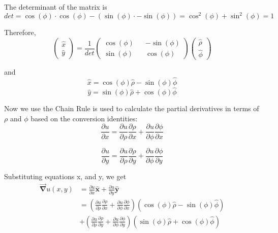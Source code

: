 \documentclass[11pt]{article}
\begin{document}
The determinant of the matrix is\\
\[det = \cos(\phi) \cdot \cos(\phi) - (\sin(\phi) \cdot -\sin(\phi)) = \cos^2(\phi) + \sin^2(\phi) = 1 \]

Therefore,
\[\left( \begin{array}{c} \hat{x} \\ \hat{y} \end{array} \right) = \frac{1}{det} \left(\begin{array}{cc} \cos(\phi) && -\sin(\phi) \\ \sin(\phi) && \cos(\phi) \end{array} \right) \left( \begin{array}{c} \hat{\rho} \\ \hat{\phi} \end{array} \right)\]

and \[\hat{x} = \cos(\phi) \hat{\rho} - \sin(\phi) \hat{\phi}\]
\[\hat{y} = \sin(\phi) \hat{\rho} + \cos(\phi) \hat{\phi}\]

Now we use the Chain Rule is used to calculate the partial derivatives
in terms of \(\rho\) and \(\phi\) based on the conversion identities:
\begin{equation}
\frac {\partial u}{\partial x} = \frac {\partial u}{\partial \rho} \frac {\partial \rho}{\partial x} + \frac {\partial u}{\partial \phi}\frac {\partial \phi}{\partial x}
\label{eq:eq5} \tag{5}
\end{equation}

\begin{equation}
\frac {\partial u}{\partial y} = \frac {\partial u}{\partial \rho} \frac {\partial \rho}{\partial y} + \frac {\partial u}{\partial \phi} \frac {\partial \phi}{\partial y}
\label{eq:eq6} \tag{6}
\end{equation}

Substituting equations x, and y, we get \begin{equation} \label{eq11111}
\begin{split}
\vec{\mathbf{\nabla}} u(x,y) & = \frac{\partial u}{\partial x} \hat{\mathbf{x}} + \frac{\partial u}{\partial y} \hat{\mathbf{y}} \\ & = \left( \frac {\partial u}{\partial \rho}\frac {\partial \rho}{\partial x} + \frac {\partial u}{\partial \phi}\frac {\partial \phi}{\partial x} \right) \left( \cos(\phi) \hat{\rho} - \sin(\phi) \hat{\phi} \right) \\ & + \left(\frac {\partial u}{\partial \rho}\frac {\partial \rho}{\partial y} + \frac {\partial u}{\partial \phi}\frac {\partial \phi}{\partial y} \right)  \left( \sin(\phi) \hat{\rho} + \cos(\phi) \hat{\phi} \right)
\end{split}
\end{equation}
\end{document}
